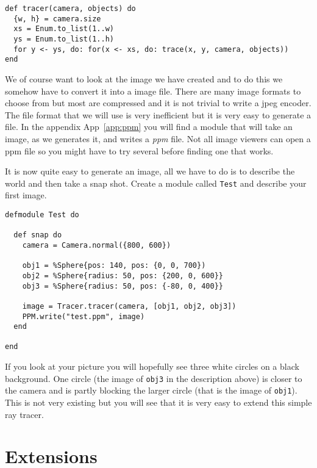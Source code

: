 \documentclass[a4paper,11pt]{article}
\begin{document}
\begin{verbatim}
def tracer(camera, objects) do
  {w, h} = camera.size
  xs = Enum.to_list(1..w)
  ys = Enum.to_list(1..h)
  for y <- ys, do: for(x <- xs, do: trace(x, y, camera, objects))
end
\end{verbatim}

We of course want to look at the image we have created and to do this
we somehow have to convert it into a image file. There are many image
formats to choose from but most are compressed and it is not trivial
to write a jpeg encoder. The file format that we will use is very
inefficient but it is very easy to generate a file. In the appendix
App~\ref{app:ppm} you will find a module that will take an image, as we
generates it, and writes a {\em ppm} file. Not all image viewers can
open a ppm file so you might have to try several before finding one that works.

It is now quite easy to generate an image, all we have to do is to
describe the world and then take a snap shot. Create a module called
{\tt Test} and describe your first image.

\pagebreak

\begin{verbatim}
defmodule Test do

  def snap do
    camera = Camera.normal({800, 600})

    obj1 = %Sphere{pos: 140, pos: {0, 0, 700})
    obj2 = %Sphere{radius: 50, pos: {200, 0, 600}}
    obj3 = %Sphere{radius: 50, pos: {-80, 0, 400}}

    image = Tracer.tracer(camera, [obj1, obj2, obj3])
    PPM.write("test.ppm", image)
  end

end
\end{verbatim}

If you look at your picture you will hopefully see three white circles
on a black background. One circle (the image of {\tt obj3} in the
description above) is closer to the camera and is partly blocking the
larger circle (that is the image of {\tt obj1}). This is not very
existing but you will see that it is very easy to extend this simple
ray tracer.



\section{Extensions}
\end{document}

